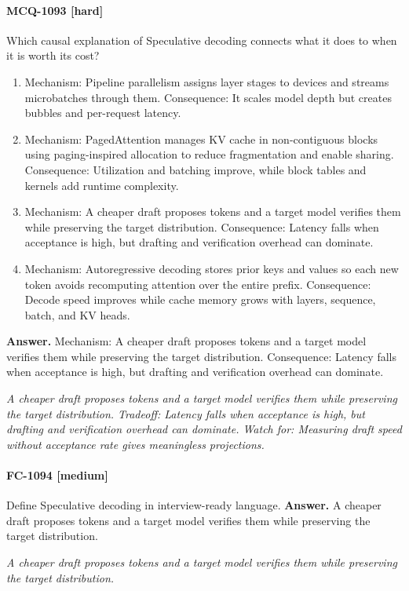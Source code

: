 \paragraph{MCQ-1093 [hard]} Which causal explanation of Speculative decoding connects what it does to when it is worth its cost?
\begin{enumerate}[label=\Alph*.]
\item Mechanism: Pipeline parallelism assigns layer stages to devices and streams microbatches through them. Consequence: It scales model depth but creates bubbles and per-request latency.
\item Mechanism: PagedAttention manages KV cache in non-contiguous blocks using paging-inspired allocation to reduce fragmentation and enable sharing. Consequence: Utilization and batching improve, while block tables and kernels add runtime complexity.
\item Mechanism: A cheaper draft proposes tokens and a target model verifies them while preserving the target distribution. Consequence: Latency falls when acceptance is high, but drafting and verification overhead can dominate.
\item Mechanism: Autoregressive decoding stores prior keys and values so each new token avoids recomputing attention over the entire prefix. Consequence: Decode speed improves while cache memory grows with layers, sequence, batch, and KV heads.
\end{enumerate}
\noindent\textbf{Answer.} Mechanism: A cheaper draft proposes tokens and a target model verifies them while preserving the target distribution. Consequence: Latency falls when acceptance is high, but drafting and verification overhead can dominate.
\par\textit{A cheaper draft proposes tokens and a target model verifies them while preserving the target distribution. Tradeoff: Latency falls when acceptance is high, but drafting and verification overhead can dominate. Watch for: Measuring draft speed without acceptance rate gives meaningless projections.}
\paragraph{FC-1094 [medium]} Define Speculative decoding in interview-ready language.
\noindent\textbf{Answer.} A cheaper draft proposes tokens and a target model verifies them while preserving the target distribution.
\par\textit{A cheaper draft proposes tokens and a target model verifies them while preserving the target distribution.}
